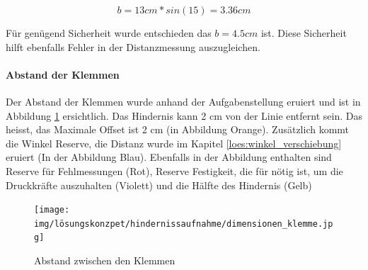 \documentclass[../main.tex]{subfiles}
\begin{document}
\[
b = 13cm * sin(15) = 3.36cm
\]

Für genügend Sicherheit wurde entschieden das $b = 4.5cm$ ist. Diese Sicherheit hilft ebenfalls Fehler in der Distanzmessung auszugleichen.

\newpage

\paragraph{Abstand der Klemmen} \label{loes:abstand_klemmen}
Der Abstand der Klemmen wurde anhand der Aufgabenstellung eruiert und ist in Abbildung \ref{img:loes_abstand_klemmen} ersichtlich. Das Hindernis kann 2 cm von der Linie entfernt sein. Das heisst, das Maximale Offset ist 2 cm (in Abbildung Orange). Zusätzlich kommt die Winkel Reserve, die Distanz wurde im Kapitel \ref{loes:winkel_verschiebung} eruiert (In der Abbildung Blau). Ebenfalls in der Abbildung enthalten sind Reserve für Fehlmessungen (Rot), Reserve Festigkeit, die für nötig ist, um die Druckkräfte auszuhalten (Violett) und die Hälfte des Hindernis (Gelb)

\begin{figure}[H]
        \centering
        \texttt{[image: img/lösungskonzpet/hindernissaufnahme/dimensionen\_klemme.jpg]}
        \caption {Abstand zwischen den Klemmen}
        \label{img:loes_abstand_klemmen}
\end{figure}
\end{document}
